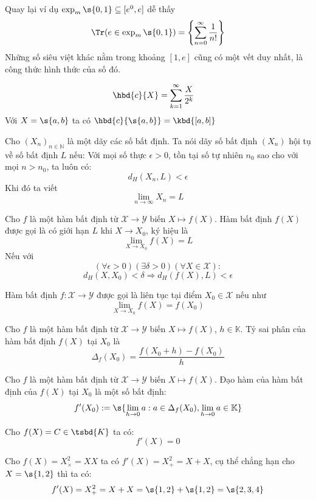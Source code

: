 \begin{example}
	Quay lại ví dụ $\exp_m\s{0,1} \subseteq [e^0,e]$ dễ thấy
	$$\Tr(e \in \exp_m\s{0,1}) = \left\{\sum_{n=0}^{\infty}\frac{1}{n!}\right\} $$
	Những số siêu việt khác nằm trong khoảng $[1,e]$ cũng có một vết duy nhất, là công thức hình thức của số đó.
\end{example}
\begin{example}
	$$\hbd{c}{X} = \sum_{k=1}^{\infty} \frac{X}{2^k}  \quad$$
	Với $X=\s{a,b}$ ta có $\hbd{c}{\s{a,b}} = \kbd{[a,b]}$
\end{example}
\begin{definition}
	Cho $(X_n)_{n \in \mathbb{N}}$ là một dãy các số bất định.
	Ta nói dãy số bất định $(X_n)$ hội tụ về số bất định $L$ nếu:
	Với mọi số thực $\epsilon > 0$, tồn tại số tự nhiên $n_0$ sao cho với mọi $n > n_0$, ta luôn có:$$d_H(X_n, L) < \epsilon$$
	Khi đó ta viết \[\lim_{n \to \infty} X_n = L\]
\end{definition}
\begin{definition}
	Cho $f$ là một hàm bất định từ $\mathcal{X} \rightarrow \mathcal{Y}$ biến $X \mapsto f(X)$. Hàm bất định $f(X)$ được gọi là có giới hạn $L$ khi $X \rightarrow X_0$, ký hiệu là $$\lim\limits_{X \rightarrow X_0}f(X) = L$$
	Nếu với $$(\forall \epsilon >0)(\exists \delta >0)(\forall X \in \mathcal{X}) : $$ $$  d_H(X,X_0)<\delta \Rightarrow d_H(f(X),L) < \epsilon$$
\end{definition}
\begin{definition}
	Hàm bất định $f : \mathcal{X} \to \mathcal{Y}$ được gọi là liên tục tại điểm $X_0 \in \mathcal{X}$ nếu như $$\lim\limits_{X \rightarrow X_0}f(X) = f(X_0)$$
\end{definition}
\begin{definition}
	Cho $f$ là một hàm bất định từ $\mathcal{X} \rightarrow \mathcal{Y}$ biến $X \mapsto f(X)$, $h \in \mathbb{K}$.
	Tỷ sai phân của hàm bất định $f(X)$ tại $X_0$ là  \[\Delta_f(X_0)= \frac{f(X_0 + h) - f(X_0)}{h}\]
\end{definition}
\begin{definition}
	Cho $f$ là một hàm bất định từ $\mathcal{X} \rightarrow \mathcal{Y}$ biến $X \mapsto f(X)$.
	Đạo hàm của hàm bất định của $f(X)$ tại $X_0$ là một số bất định: $$f'(X_0) := \s{\lim_{h\rightarrow 0}{a: a \in \Delta_f(X_0) , \lim_{h\rightarrow 0}a \in \mathbb{K}}}$$
\end{definition}
\begin{example}
	Cho $f(X) = C \in \tsbd{K}$ ta có: $$f'(X) = 0$$
\end{example}
\begin{example}
	Cho $f(X) = X^2_\times = XX $ ta có $f'(X) = X^2_+ = X+X$, cụ thể chẳng hạn cho $X = \s{1,2}$ thì ta có:
	$$f'(X) = X^2_+ = X+X = \s{1,2} + \s{1,2} = \s{2,3,4}$$
\end{example}

